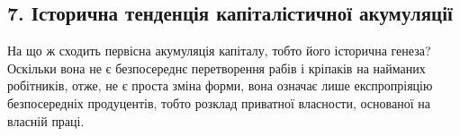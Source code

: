 \subsection{7. Історична тенденція капіталістичної акумуляції}

На що ж сходить первісна акумуляція капіталу, тобто його
історична генеза? Оскільки вона не є безпосереднє перетворення
рабів і кріпаків на найманих робітників, отже, не є проста
зміна форми, вона означає лише експропріяцію безпосередніх
продуцентів, тобто розклад приватної власности, основаної на
власній праці.
